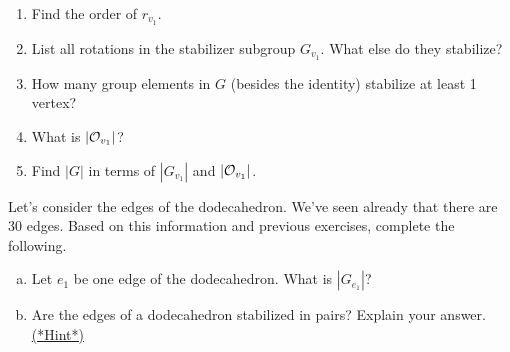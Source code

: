 \begin{exercise}\label{exercise:actions:Dodeca4}
\begin{enumerate} 
\item Find the order of $r_{v_1}$.
\item List all rotations in the stabilizer subgroup $G_{v_1}$.  What else do they stabilize?
\item How many group elements in $G$ (besides the identity) stabilize at least 1 vertex?
\item What is $|{\cal O}_{v_1}|$?
\item Find $|G|$ in terms of $|G_{v_1}|$ and $|{\cal O}_{v_1}|$.
\end{enumerate}
\end{exercise}
Let's consider the edges of the dodecahedron.  We've seen already that there are 30 edges.  Based on this information and previous exercises, complete the following.

\begin{exercise}\label{exercise:actions:Dodeca5}
\begin{enumerate}[(a)]
\item Let $e_1$ be one edge of the dodecahedron. What is $|G_{e_1}|$?
\item Are the edges of a dodecahedron stabilized in pairs?  Explain your answer.
\hyperref[sec:actions:hints]{(*Hint*)}
\end{enumerate}
\end{exercise}

